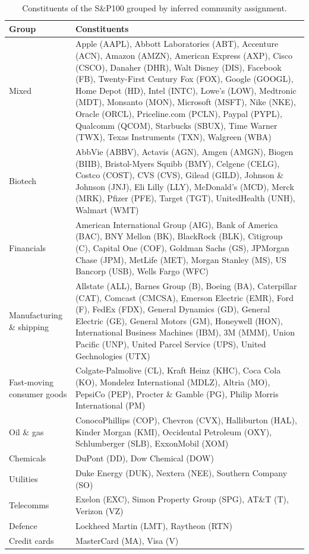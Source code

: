\documentclass[onecolumn,pre,superscriptaddress, longbibliography, nofootinbib, notitlepage]{revtex4-1}
\begin{document}
\begin{table}
    \begin{tabularx}{\columnwidth}{p{2.5cm}X}
        \hline\small
        \textbf{Group} & \textbf{Constituents} \\
        \hline
        Mixed & Apple (AAPL), Abbott Laboratories (ABT), Accenture (ACN), Amazon (AMZN), American Express (AXP), Cisco (CSCO), Danaher (DHR), Walt Disney (DIS), Facebook (FB), Twenty-First Century Fox (FOX), Google (GOOGL), Home Depot (HD), Intel (INTC), Lowe's (LOW), Medtronic (MDT), Monsanto (MON), Microsoft (MSFT), Nike (NKE), Oracle (ORCL), Priceline.com (PCLN), Paypal (PYPL), Qualcomm (QCOM), Starbucks (SBUX), Time Warner (TWX), Texas Instruments (TXN), Walgreen (WBA)\\
        Biotech & AbbVie (ABBV), Actavis (AGN), Amgen (AMGN), Biogen (BIIB), Bristol-Myers Squibb (BMY), Celgene (CELG), Costco (COST), CVS (CVS), Gilead (GILD), Johnson \& Johnson (JNJ), Eli Lilly (LLY), McDonald's (MCD), Merck (MRK), Pfizer (PFE), Target (TGT), UnitedHealth (UNH), Walmart (WMT)\\
        Financials & American International Group (AIG), Bank of America (BAC), BNY Mellon (BK), BlackRock (BLK), Citigroup (C), Capital One (COF), Goldman Sachs (GS), JPMorgan Chase (JPM), MetLife (MET), Morgan Stanley (MS), US Bancorp (USB), Wells Fargo (WFC)\\
        Manufacturing \& shipping & Allstate (ALL), Barnes Group (B), Boeing (BA), Caterpillar (CAT), Comcast (CMCSA), Emerson Electric (EMR), Ford (F), FedEx (FDX), General Dynamics (GD), General Electric (GE), General Motors (GM), Honeywell (HON), International Business Machines (IBM), 3M (MMM), Union Pacific (UNP), United Parcel Service (UPS), United Gechnologies (UTX)\\
        Fast-moving consumer goods & Colgate-Palmolive (CL), Kraft Heinz (KHC), Coca Cola (KO), Mondelez International (MDLZ), Altria (MO), PepsiCo (PEP), Procter \& Gamble (PG), Philip Morris International (PM)\\
        Oil \& gas & ConocoPhillips (COP), Chevron (CVX), Halliburton (HAL), Kinder Morgan (KMI), Occidental Petroleum (OXY), Schlumberger (SLB), ExxonMobil (XOM)\\
        Chemicals & DuPont (DD), Dow Chemical (DOW)\\
        Utilities & Duke Energy (DUK), Nextera (NEE), Southern Company (SO)\\
        Telecomms & Exelon (EXC), Simon Property Group (SPG), AT\&T (T), Verizon (VZ)\\
        Defence & Lockheed Martin (LMT), Raytheon (RTN)\\
        Credit cards & MasterCard (MA), Visa (V)\\
        \hline
    \end{tabularx}
    \caption{\label{tbl:sp100-assignments} Constituents of the S\&P100 grouped by inferred community assignment.}
\end{table}
\end{document}
